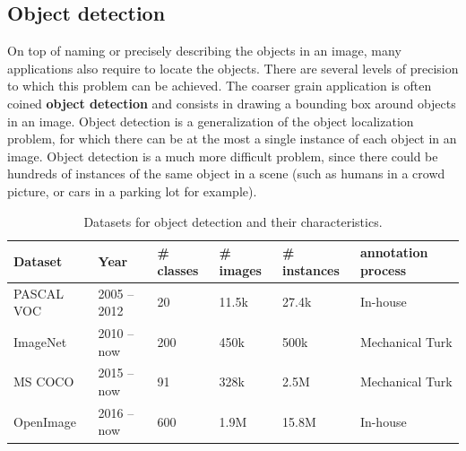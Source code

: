 \subsection{Object detection}

On top of naming or precisely describing the objects in an image,
many applications also require to locate the objects.
There are several levels of precision to which this problem can be achieved.
The coarser grain application is often coined \textbf{object detection}
and consists in drawing a bounding box around objects in an image.
Object detection is a generalization of the object localization problem,
for which there can be at the most a single instance of each object in an image.
Object detection is a much more difficult problem,
since there could be hundreds of instances of the same object in a scene
(such as humans in a crowd picture, or cars in a parking lot for example).

\begin{table}
\centering
\caption{Datasets for object detection and their characteristics.}
\begin{tabular}{llllll}
	Dataset & Year & \# classes & \# images & \# instances & annotation process \\
	\midrule
	PASCAL VOC \cite{Everingham10} & 2005 -- 2012 & 20 & 11.5k & 27.4k & In-house \\
	ImageNet\cite{ILSVRC15} & 2010 -- now & 200 & 450k & 500k & Mechanical Turk \\
	MS COCO \cite{lin2014microsoft} & 2015 -- now & 91 & 328k & 2.5M & Mechanical Turk \\
	OpenImage \cite{OpenImages, OpenImages2} & 2016 -- now & 600 & 1.9M & 15.8M & In-house \\
\end{tabular}%
\label{tab:detection_ds}
\end{table}

